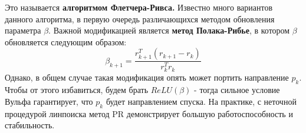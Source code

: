 Это называется \textbf{алгоритмом Флетчера-Ривса.} Известно много вариантов данного алгоритма, в первую очередь различающихся методом обновления параметра $\beta$. Важной модификацией является \textbf{метод Полака-Рибье}, в котором $\beta$ обновляется следующим образом: $$\beta_{k+1} = \frac{r_{k+1}^T (r_{k+1} - r_k)}{r_k^T r_k}$$ Однако, в общем случае такая модификация опять может портить направление $p_k$. Чтобы от этого избавиться, будем брать $ReLU(\beta)$ - тогда сильное условие Вульфа гарантирует, что $p_k$ будет направлением спуска.  На практике, с неточной процедурой линпоиска метод PR демонстрирует большую работоспособность и стабильность.
